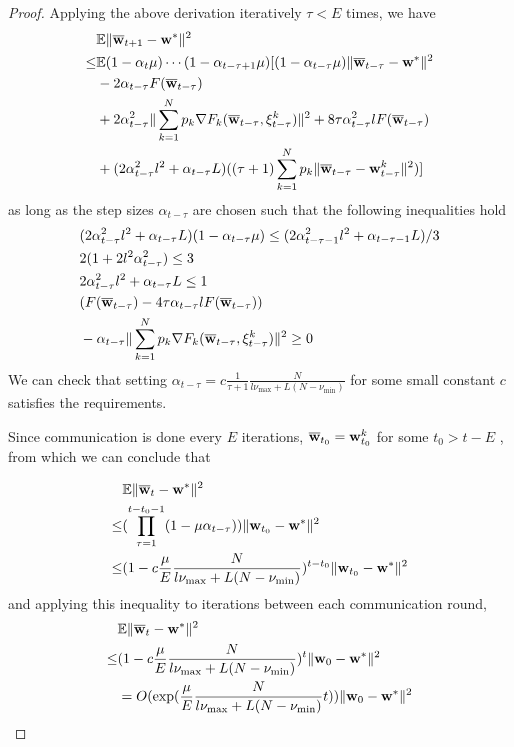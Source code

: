 \begin{proof}
	Applying the above derivation iteratively $\tau<E$ times, we have
	\begin{align*}
	& \mathbb{E}\|{\overline{\mathbf{w}}}_{t+1}-{\mathbf{w}}^{\ast}\|^{2}\\
	\leq &\mathbb{E}(1-\alpha_{t}\mu)\cdots(1-\alpha_{t-\tau+1}\mu)[(1-\alpha_{t-\tau}\mu)\|{\overline{\mathbf{w}}}_{t-\tau}-{\mathbf{w}}^{\ast}\|^{2}\\
	& -2\alpha_{t-\tau}F({\overline{\mathbf{w}}}_{t-\tau})\\
	&+2\alpha_{t-\tau}^{2}\|\sum_{k=1}^{N}p_{k}\nabla F_{k}({\overline{\mathbf{w}}}_{t-\tau},\xi_{t-\tau}^{k})\|^{2}+8\tau\alpha_{t-\tau}^{2}lF({\overline{\mathbf{w}}}_{t-\tau})\\
	& +(2\alpha_{t-\tau}^{2}l^{2}+\alpha_{t-\tau}L)((\tau+1)\sum_{k=1}^{N}p_{k}\|{\overline{\mathbf{w}}}_{t-\tau}-{\mathbf{w}}_{t-\tau}^{k}\|^{2})]
	\end{align*}
	as long as the step sizes $\alpha_{t-\tau}$ are chosen such that
	the following inequalities hold 
	\begin{align*}
	&(2\alpha_{t-\tau}^{2}l^{2}+\alpha_{t-\tau}L)(1-\alpha_{t-\tau}\mu)  \leq(2\alpha_{t-\tau-1}^{2}l^{2}+\alpha_{t-\tau-1}L)/3\\
	&2(1+2l^{2}\alpha_{t-\tau}^{2})  \leq3\\
	&2\alpha_{t-\tau}^{2}l^{2}+\alpha_{t-\tau}L  \leq1\\
	&(F({\overline{\mathbf{w}}}_{t-\tau})-4\tau\alpha_{t-\tau}lF({\overline{\mathbf{w}}}_{t-\tau}))\\
	&-\alpha_{t-\tau}\|\sum_{k=1}^{N}p_{k}\nabla F_{k}({\overline{\mathbf{w}}}_{t-\tau},\xi_{t-\tau}^{k})\|^{2}  \geq0
	\end{align*}
	We can check that setting $\alpha_{t-\tau}=c\frac{1}{\tau+1}\frac{N}{l\nu_{\max}+L(N-\nu_{\min})}$
	for some small constant $c$ satisfies the requirements. 
	
	Since communication is done every $E$ iterations, ${\overline{\mathbf{w}}}_{t_{0}}={\mathbf{w}}_{t_{0}}^{k}$
	for some $t_{0}>t-E$ , from which we can conclude that 
	
	\begin{align*}
	&\mathbb{E}\|{\overline{\mathbf{w}}}_{t}-{\mathbf{w}}^{\ast}\|^{2} \\
	 \leq&(\prod_{\tau=1}^{t-t_{0}-1}(1-\mu\alpha_{t-\tau}))\|{\mathbf{w}}_{t_{0}}-{\mathbf{w}}^{\ast}\|^{2}\\
	\leq &(1-c\frac{\mu}{E}\frac{N}{l\nu_{\max}+L(N-\nu_{\min})})^{t-t_{0}}\|{\mathbf{w}}_{t_{0}}-{\mathbf{w}}^{\ast}\|^{2}
	\end{align*}
	and applying this inequality to iterations between each communication
	round, 
	\begin{align*}
	&\mathbb{E}\|{\overline{\mathbf{w}}}_{t}-{\mathbf{w}}^{\ast}\|^{2} \\
	\leq&(1-c\frac{\mu}{E}\frac{N}{l\nu_{\max}+L(N-\nu_{\min})})^{t}\|{\mathbf{w}}_{0}-{\mathbf{w}}^{\ast}\|^{2}\\
	& =O(\exp(\frac{\mu}{E}\frac{N}{l\nu_{\max}+L(N-\nu_{\min})}t))\|{\mathbf{w}}_{0}-{\mathbf{w}}^{\ast}\|^{2}
	\end{align*}
	

\end{proof}
